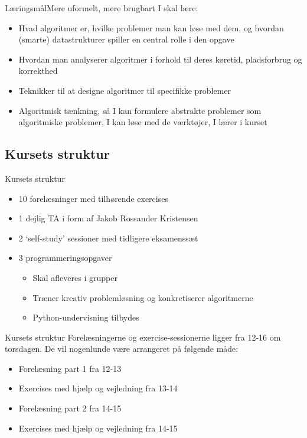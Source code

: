 \documentclass{beamer}
\begin{document}
\begin{frame}{Læringsmål}{Mere uformelt, mere brugbart}
    I skal lære:
    \pause
    \begin{itemize}
        \item Hvad algoritmer er, hvilke problemer man kan løse med dem, og
            hvordan (smarte) datastrukturer spiller en central rolle i den
            opgave
            \pause
        \item Hvordan man analyserer algoritmer i forhold til deres køretid,
            pladsforbrug og korrekthed
            \pause
        \item Teknikker til at designe algoritmer til specifikke problemer
            \pause
        \item Algoritmisk tænkning, så I kan formulere abstrakte problemer som
            algoritmiske problemer, I kan løse med de værktøjer, I lærer i
            kurset
    \end{itemize}
\end{frame}



\subsection[Struktur]{Kursets struktur}

\begin{frame}{Kursets struktur}
   \begin{itemize}
       \item 10 forelæsninger med tilhørende exercises \pause
       \item 1 dejlig TA i form af Jakob Rossander Kristensen \pause
       \item 2 `self-study' sessioner med tidligere eksamenssæt \pause
       \item 3 programmeringsopgaver \pause
           \begin{itemize}
               \item Skal afleveres i grupper
               \item Træner kreativ problemløsning og konkretiserer algoritmerne
               \item Python-undervisning tilbydes
           \end{itemize}
   \end{itemize} 
\end{frame}

\begin{frame}{Kursets struktur}
    Forelæsningerne og exercise-sessionerne ligger fra 12-16 om torsdagen. De
    vil nogenlunde være arrangeret på følgende måde:

    \pause

    \begin{itemize}
        \item Forelæsning part 1 fra 12-13
        \item Exercises med hjælp og vejledning fra 13-14
        \item Forelæsning part 2 fra 14-15
        \item Exercises med hjælp og vejledning fra 14-15
    \end{itemize}

\end{frame}
\end{document}

